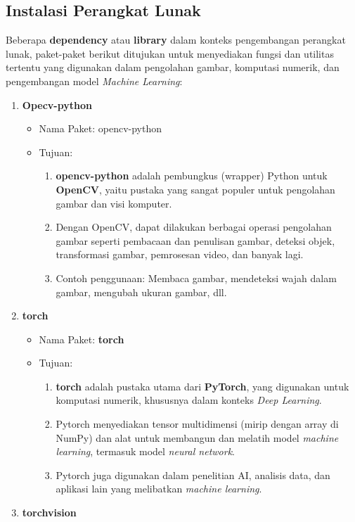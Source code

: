\documentclass[a4paper,11pt]{book}
\begin{document}
\subsection*{Instalasi Perangkat Lunak}
Beberapa \textbf{dependency} atau \textbf{library} dalam konteks pengembangan perangkat lunak, paket-paket berikut ditujukan untuk menyediakan fungsi dan utilitas tertentu yang digunakan dalam pengolahan gambar, komputasi numerik, dan pengembangan model \textit{Machine Learning}:
\begin{enumerate}
	\item \textbf{Opecv-python}
	\begin{itemize}
		\item Nama Paket: opencv-python
		\item Tujuan:
			\begin{enumerate}
				\item \textbf{opencv-python} adalah pembungkus (wrapper) Python untuk \textbf{OpenCV}, yaitu pustaka yang sangat populer untuk pengolahan gambar dan visi komputer.
				\item Dengan OpenCV, dapat dilakukan berbagai operasi pengolahan gambar seperti pembacaan dan penulisan gambar, deteksi objek, transformasi gambar, pemrosesan video, dan banyak lagi.
				\item Contoh penggunaan: Membaca gambar, mendeteksi wajah dalam gambar, mengubah ukuran gambar, dll.
			\end{enumerate}
	\end{itemize}
	\item \textbf{torch}
	\begin{itemize}
		\item Nama Paket: \textbf{torch}
		\item Tujuan: 
		\begin{enumerate}
			\item \textbf{torch} adalah pustaka utama dari \textbf{PyTorch}, yang digunakan untuk komputasi numerik, khususnya dalam konteks \textit{Deep Learning}.
			\item Pytorch menyediakan tensor multidimensi (mirip dengan array di NumPy) dan alat untuk membangun dan melatih model \textit{machine learning}, termasuk model \textit{neural network}.
			\item Pytorch juga digunakan dalam penelitian AI, analisis data, dan aplikasi lain yang melibatkan \textit{machine learning}.
		\end{enumerate}
	\end{itemize}
	\item \textbf{torchvision}

\end{enumerate}
\end{document}
